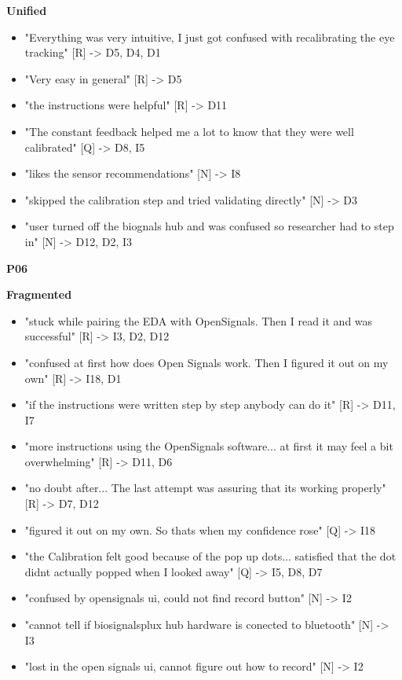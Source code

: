 \documentclass[
]{article}
\begin{document}
\textbf{Unified}

\begin{itemize}
\item
  "Everything was very intuitive, I just got confused with recalibrating the eye tracking" {[}R{]} -\textgreater{} D5, D4, D1
\item
  "Very easy in general" {[}R{]} -\textgreater{} D5
\item
  "the instructions were helpful" {[}R{]} -\textgreater{} D11
\item
  "The constant feedback helped me a lot to know that they were well calibrated" {[}Q{]} -\textgreater{} D8, I5
\item
  "likes the sensor recommendations" {[}N{]} -\textgreater{} I8
\item
  "skipped the calibration step and tried validating directly" {[}N{]} -\textgreater{} D3
\item
  "user turned off the biognals hub and was confused so researcher had to step in" {[}N{]} -\textgreater{} D12, D2, I3
\end{itemize}

\textbf{P06}

\textbf{Fragmented}

\begin{itemize}
\item
  "stuck while pairing the EDA with OpenSignals. Then I read it and was successful" {[}R{]} -\textgreater{} I3, D2, D12
\item
  "confused at first how does Open Signals work. Then I figured it out on my own" {[}R{]} -\textgreater{} I18, D1
\item
  "if the instructions were written step by step anybody can do it" {[}R{]} -\textgreater{} D11, I7
\item
  "more instructions using the OpenSignals software... at first it may feel a bit overwhelming" {[}R{]} -\textgreater{} D11, D6
\item
  "no doubt after... The last attempt was assuring that it\textquotesingle s working properly" {[}R{]} -\textgreater{} D7, D12
\item
  "figured it out on my own. So that\textquotesingle s when my confidence rose" {[}Q{]} -\textgreater{} I18
\item
  "the Calibration felt good because of the pop up dots... satisfied that the dot didn\textquotesingle t actually popped when I looked away" {[}Q{]} -\textgreater{} I5, D8, D7
\item
  "confused by opensignals ui, could not find record button" {[}N{]} -\textgreater{} I2
\item
  "cannot tell if biosignalsplux hub hardware is conected to bluetooth" {[}N{]} -\textgreater{} I3
\item
  "lost in the open signals ui, cannot figure out how to record" {[}N{]} -\textgreater{} I2
\end{itemize}
\end{document}
